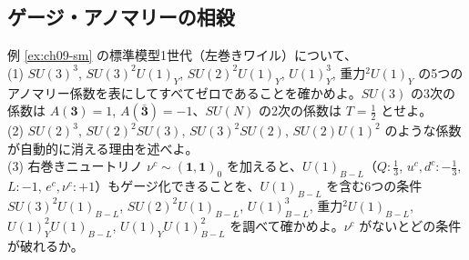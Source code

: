 \subsection{ゲージ・アノマリーの相殺}

\begin{problem}[難易度 B]\label{ch09-prob-sm}
例 \ref{ex:ch09-sm} の標準模型1世代（左巻きワイル）について、\\
(1) $SU(3)^3$, $SU(3)^2U(1)_Y$, $SU(2)^2U(1)_Y$, $U(1)_Y^3$, 重力$^2U(1)_Y$ の5つのアノマリー係数を表にしてすべてゼロであることを確かめよ。$SU(3)$ の3次の係数は $A(\mathbf3)=1$, $A(\bar{\mathbf 3})=-1$、$SU(N)$ の2次の係数は $T=\frac12$ とせよ。\\
(2) $SU(2)^3$, $SU(2)^2SU(3)$, $SU(3)^2SU(2)$, $SU(2)U(1)^2$ のような係数が自動的に消える理由を述べよ。\\
(3) 右巻きニュートリノ $\nu^c\sim(\mathbf 1,\mathbf 1)_0$ を加えると、$U(1)_{B-L}$（$Q:\frac13$, $u^c,d^c:-\frac13$, $L:-1$, $e^c,\nu^c:+1$）もゲージ化できることを、$U(1)_{B-L}$ を含む6つの条件 $SU(3)^2U(1)_{B-L}$, $SU(2)^2U(1)_{B-L}$, $U(1)_{B-L}^3$, 重力$^2U(1)_{B-L}$, $U(1)_Y^2U(1)_{B-L}$, $U(1)_YU(1)_{B-L}^2$ を調べて確かめよ。$\nu^c$ がないとどの条件が破れるか。
\end{problem}

